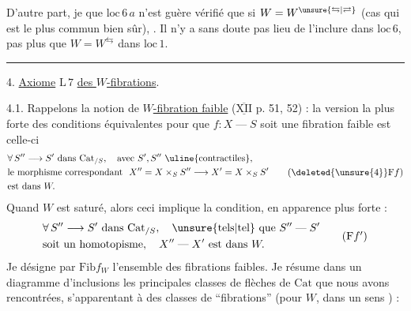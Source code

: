 D'autre part, je  que $\mathrm{loc}\,6\,a$ n'est
guère vérifié que si  $W=W^{\unsure{\leftrightarrows|\rightleftarrows}}$
 (cas qui est le plus commun bien sûr),
.
Il n'y a sans doute pas lieu de l'inclure
dans $\mathrm{loc}\,6$, pas plus que $W=W^{\leftrightarrows}$ dans $\mathrm{loc}\,1$.

\begin{center}\rule{0.15\linewidth}{0.4pt}\end{center}

4. \uline{Axiome} $\mathrm{L}\,7$ \uline{des $W$-fibrations}.

4.1. Rappelons la notion de \uline{$W$-fibration faible}
($\overline{\underline{\mathrm{XII}}}$ p. 51, 52) : la version la plus forte des 
conditions équivalentes pour que $f:X\mathrel{\text{---}}S$
soit une fibration faible est celle-ci
\[
\begin{aligned}
&\forall\, S''\longrightarrow S' \ \text{dans }\mathrm{Cat}_{/S},\quad
   \text{avec } S',S''\ \text{\uline{contractiles}},\\
&\text{le morphisme correspondant }\ X''=X\times_S S''\longrightarrow X'=X\times_S S'\\
&\text{est dans } W.
\end{aligned}
\tag*{\normalfont($\deleted{\unsure{4}}\mathrm{F}f$)}
\]
Quand $W$ est  saturé, alors ceci
implique la condition, en apparence plus forte :
\[
\begin{aligned}
&\forall\, S''\longrightarrow S'\ \text{dans }\mathrm{Cat}_{/S},\quad \text{\unsure{tels|tel} que }S''\mathrel{\text{---}}S'\\
&\text{soit un homotopisme},\quad X''\mathrel{\text{---}}X'\ \text{est dans } W.
\end{aligned}
\tag*{($\mathrm{F}f'$)}
\]
Je désigne par $\mathrm{Fib}f_W$ l'ensemble des
fibrations faibles.  Je résume dans
un diagramme d'inclusions les principales
classes de flèches de $\mathrm{Cat}$ que nous avons
rencontrées, s'apparentant à des classes
de ``fibrations'' (pour $W$, dans un sens
) :

